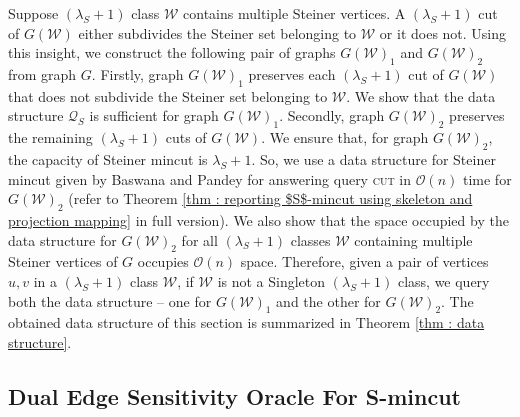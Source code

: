 \documentclass[letterpaper,11pt]{article}
\begin{document}
Suppose $(\lambda_S+1)$ class ${\mathcal W}$ contains multiple Steiner vertices. A $(\lambda_S+1)$ cut of $G({\mathcal W})$ either subdivides the Steiner set belonging to ${\mathcal W}$ or it does not. Using this insight, we construct the following pair of graphs $G({\mathcal W})_1$ and $G({\mathcal W})_2$ from graph $G$. Firstly, graph $G({\mathcal W})_1$ preserves each $(\lambda_S+1)$ cut of $G({\mathcal W})$ that does not subdivide the Steiner set belonging to ${\mathcal W}$. We show that the data structure ${\mathcal Q}_S$ is sufficient for graph $G({\mathcal W})_1$. Secondly, graph $G({\mathcal W})_2$ preserves the remaining $(\lambda_S+1)$ cuts of $G({\mathcal W})$. We ensure that, for graph $G({\mathcal W})_2$, the capacity of Steiner mincut is $\lambda_S+1$. So, we use a data structure for Steiner mincut given by Baswana and Pandey \cite{DBLP:conf/soda/BaswanaP22} for answering query \textsc{cut} in ${\mathcal O}(n)$ time for $G({\mathcal W})_2$ (refer to Theorem \ref{thm : reporting $S$-mincut using skeleton and projection mapping} in full version). We also show that the space occupied by the data structure for $G({\mathcal W})_2$ for all $(\lambda_S+1)$ classes ${\mathcal W}$ containing multiple Steiner vertices of $G$ occupies ${\mathcal O}(n)$ space. Therefore, given a pair of vertices $u,v$ in a $(\lambda_S+1)$ class ${\mathcal W}$, if ${\mathcal W}$ is not a Singleton $(\lambda_S+1)$ class, we query both the data structure -- one for $G({\mathcal W})_1$ and the other for $G({\mathcal W})_2$. The obtained data structure of this section is summarized in Theorem \ref{thm : data structure}.










\subsection{Dual Edge Sensitivity Oracle For S-mincut} \label{sec : dual failure overview}
\end{document}
